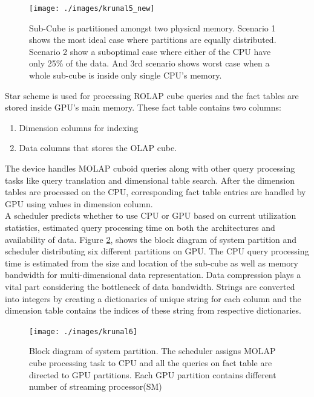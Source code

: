 \documentclass[runningheads,a4paper]{llncs}
\begin{document}
{\begin{figure}[!htb]
	\texttt{[image: ./images/krunal5\_new]}
	\centering
	\caption{Sub-Cube is partitioned amongst two physical memory. Scenario 1 shows the most ideal case where partitions are equally distributed. Scenario 2 show a suboptimal case where either of the CPU have only 25\% of the data. And 3rd scenario shows worst case when a whole sub-cube is inside only single CPU's memory. }
	\label{fig:Cuboid_divide}
\end{figure}

Star scheme is used for processing ROLAP cube queries and the fact tables are stored inside GPU's main memory. These fact table contains two columns:
\begin{enumerate}
	\item Dimension columns for indexing
	\item Data columns that stores the OLAP cube. 
\end{enumerate}

The device handles MOLAP cuboid queries along with other query processing tasks like query translation and dimensional table search. After the dimension tables are processed on the CPU, corresponding fact table entries are handled by GPU using values in dimension column.\\

A scheduler predicts whether to use CPU or GPU based on current utilization statistics, estimated query processing time on both the architectures and availability of data. Figure \ref{fig:krunal6}, shows the block diagram of system partition and scheduler distributing six different partitions on GPU. The CPU query processing time is estimated from the size and location of the sub-cube as well as memory bandwidth for multi-dimensional data representation. Data compression plays a vital part considering the bottleneck of data bandwidth. Strings are converted into integers by creating a dictionaries of unique string for each column and the dimension table contains the indices of these string from respective dictionaries.
\begin{figure}[!htb]
	\texttt{[image: ./images/krunal6]}
	\centering
	\caption{Block diagram of system partition. The scheduler assigns MOLAP cube processing task to CPU and all the queries on fact table are directed to GPU partitions. Each GPU partition contains different number of streaming processor(SM)   \cite{riha2013adaptive}}
	\label{fig:krunal6}
\end{figure}

}
\end{document}
